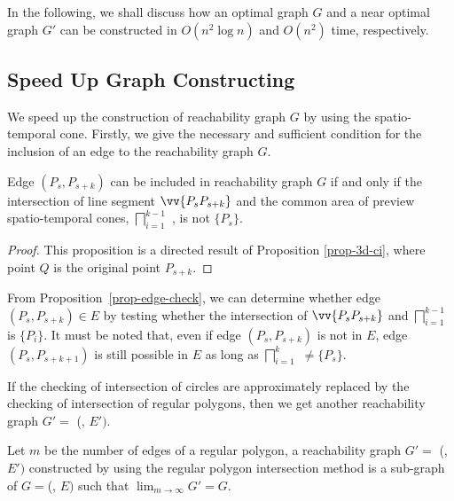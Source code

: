 In the following, we shall discuss how an optimal graph $G$ and a near optimal graph $G'$ can be constructed in $O(n^2\log n)$ and $O(n^2)$ time, respectively.


\subsection{Speed Up Graph Constructing} %
We speed up the construction of reachability graph $G$ by using the spatio-temporal cone.
Firstly, we give the necessary and sufficient condition for the inclusion of an edge to the reachability graph $G$.

\begin{prop}
\label{prop-edge-check}
Edge $(P_{s}, P_{s+k})$ can be included in reachability graph $G$ if and only if the intersection of line segment $\vv{P_{s}P_{s+k}}$ and 
the common area of preview spatio-temporal cones, \ie $\bigsqcap_{i=1}^{k-1}$ , is not $\{P_s\}$.
\end{prop}

\begin{proof}
This proposition is a directed result of Proposition \ref{prop-3d-ci}, where point $Q$ is the original point $P_{s+k}$. 
\end{proof}


From Proposition~\ref{prop-edge-check}, we can determine whether edge $(P_s, P_{s+k}) \in E$ by testing whether the intersection of $\vv{P_sP_{s+k}}$ and $\bigsqcap_{i=1}^{k - 1}$ is $\{P_i\}$. 
It must be noted that, even if edge $(P_s, P_{s+k})$ is not in $E$, edge $(P_s, P_{s+k+1})$ is still possible in $E$ as long as $\bigsqcap_{i=1}^{k}$ $\ne \{P_s\}$.


%
If the checking of intersection of circles are approximately replaced by the checking of intersection of regular polygons, then we get another reachability graph $G'=$ (, $E')$.

\begin{prop}
	\label{prop-near-opt-graph}
	Let $m$ be the number of edges of a regular polygon,
	a reachability graph $G'=$ (, $E')$ constructed by using the regular polygon intersection method is a sub-graph of $G=$(, $E)$ such that $\lim_{m \to \infty}{G'=G}$.
\end{prop}

